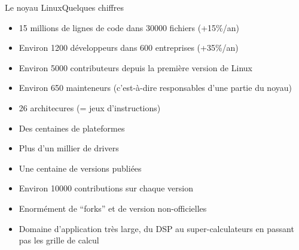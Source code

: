 \begin{frame}{Le noyau Linux}{Quelques chiffres}
  \begin{itemize}
  \item 15 millions de lignes de code dans 30000 fichiers (+15\%/an)
  \item Environ 1200 développeurs dans 600 entreprises (+35\%/an)
  \item Environ 5000 contributeurs depuis la première version de Linux
  \item  Environ  650  mainteneurs  (c'est-à-dire  responsables  d'une
    partie du noyau)
  \item 26 architecures (= jeux d'instructions)
  \item Des centaines de plateformes
  \item Plus d'un millier de drivers
  \item Une centaine de versions publiées
  \item Environ 10000 contributions sur chaque version
  \item Enormément de ``forks'' et de version non-officielles
  \item Domaine d'application très large, du DSP au super-calculateurs
    en passant pas les grille de calcul
  \end{itemize}
\end{frame}




